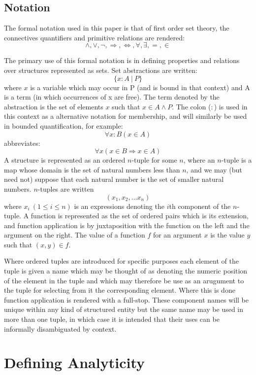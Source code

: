 \documentclass{rbjk}
\begin{document}
\begin{article}
\subsection{Notation}

The formal notation used in this paper is that of first order set theory, the connectives quantifiers and primitive relations are rendered:
\[ \land, \lor, \lnot, \Rightarrow, \Leftrightarrow, \forall, \exists, =, \in \]

The primary use of this formal notation is in defining properties and relations over structures represented as sets.
Set abstractions are written:
\[ \{x:A\ |\ P\} \]
where $x$ is a variable which may occur in P (and is bound in that context) and A is a term (in which occurrences of x are free).
The term denoted by the abstraction is the set of elements $x$ such that $x \in A \land P$.  
The colon ($:$) is used in this context as a alternative notation for membership, and will similarly be used in bounded quantification, for example:
\[ \forall x:B (x \in A) \]
abbreviates:
\[ \forall x (x \in B \Rightarrow x \in A) \]
A structure is represented as an ordered $n$-tuple for some $n$, where an $n$-tuple is a map whose domain is the set of natural numbers less than $n$, and we may (but need not) suppose that each natural number is the set of smaller natural numbers.
$n$-tuples are written
\[ (x_1, x_2, \ldots x_n) \] where $x_i\ (1\leq i\leq n)$ is an expressions denoting the $i$th component of the $n$-tuple.
A function is represented as the set of ordered pairs which is its extension, and function application is by juxtaposition with the function on the left and the argument on the right.
The value of a function $f$ for an argument $x$ is the value $y$ such that $(x,y) \in f$. 

Where ordered tuples are introduced for specific purposes each element of the tuple is given a name which may be thought of as denoting the numeric position of the element in the tuple and which may therefore be use as an arugument to the tuple for selecting from it the corresponding element.
Where this is done function application is rendered with a full-stop.
These component names will be unique within any kind of structured entity but the same name may be used in more than one tuple, in which case it is intended that their uses can be informally disambiguated by context.

\section{Defining Analyticity}


\end{article}
\end{document}

